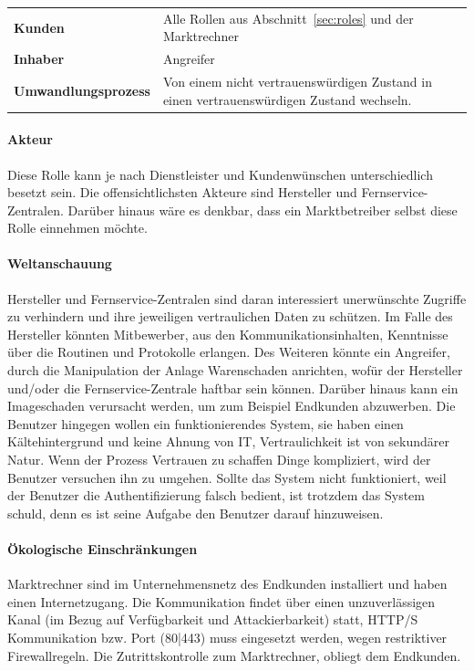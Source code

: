 \documentclass[11pt,a4paper]{report}
\begin{document}
\setlength{\tabcolsep}{12pt}
\renewcommand{\arraystretch}{1.5}
\begin{table}[h] %
\begin{tabularx}{\linewidth}{@{}lX@{}}
\textbf{Kunden} & Alle Rollen aus Abschnitt~\ref{sec:roles} und der Marktrechner\\
\textbf{Inhaber} & Angreifer\\
\textbf{Umwandlungsprozess} & 
Von einem nicht vertrauenswürdigen Zustand in einen vertrauenswürdigen Zustand wechseln.\\
\end{tabularx}
\end{table}

\paragraph{Akteur} Diese Rolle kann je nach Dienstleister und Kundenwünschen unterschiedlich besetzt sein. Die offensichtlichsten Akteure sind Hersteller und Fernservice-Zentralen. Darüber hinaus wäre es denkbar, dass ein Marktbetreiber selbst diese Rolle einnehmen möchte.

\paragraph{Weltanschauung} Hersteller und Fernservice-Zentralen sind daran interessiert unerwünschte Zugriffe zu verhindern und ihre jeweiligen vertraulichen Daten zu schützen. Im Falle des Hersteller könnten Mitbewerber, aus den Kommunikationsinhalten, Kenntnisse über die Routinen und Protokolle erlangen. Des Weiteren könnte ein Angreifer, durch die Manipulation der Anlage Warenschaden anrichten, wofür der Hersteller und/oder die Fernservice-Zentrale haftbar sein können. Darüber hinaus kann ein Imageschaden verursacht werden, um zum Beispiel Endkunden abzuwerben. Die Benutzer hingegen wollen ein funktionierendes System, sie haben einen Kältehintergrund und keine Ahnung von IT, Vertraulichkeit ist von sekundärer Natur. Wenn der Prozess Vertrauen zu schaffen Dinge kompliziert, wird der Benutzer versuchen ihn zu umgehen. Sollte das System nicht funktioniert, weil der Benutzer die Authentifizierung falsch bedient, ist trotzdem das System schuld, denn es ist seine Aufgabe den Benutzer darauf hinzuweisen.

\paragraph{Ökologische Einschränkungen} Marktrechner sind im Unternehmensnetz des Endkunden installiert und haben einen Internetzugang. Die Kommunikation findet über einen unzuverlässigen Kanal (im Bezug auf Verfügbarkeit und Attackierbarkeit) statt, HTTP/S Kommunikation bzw. Port (80|443) muss eingesetzt werden, wegen restriktiver Firewallregeln. Die Zutrittskontrolle zum Marktrechner, obliegt dem Endkunden.
\end{document}
